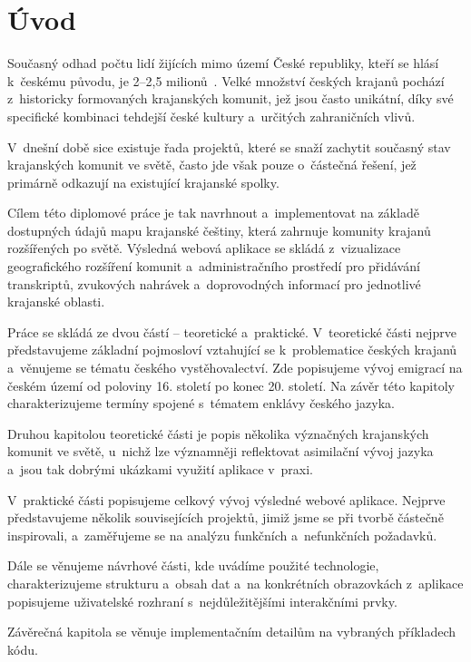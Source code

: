 \hypertarget{uxfavod}{%
\chapter*{Úvod}\label{uvod}}

Současný odhad počtu lidí žijících mimo území České republiky, kteří se hlásí k~českému původu, je 2--2,5 milionů~\parencite{Krajane-mv2}. Velké množství českých krajanů pochází z~historicky formovaných krajanských komunit, jež jsou často unikátní, díky své specifické kombinaci tehdejší české kultury a~určitých zahraničních vlivů.

V~dnešní době sice existuje řada projektů, které se snaží zachytit současný stav krajanských komunit ve světě, často jde však pouze o~částečná řešení, jež primárně odkazují na existující krajanské spolky.

Cílem této diplomové práce je tak navrhnout a~implementovat na základě dostupných údajů mapu krajanské češtiny, která zahrnuje komunity krajanů rozšířených po světě. Výsledná webová aplikace se skládá z~vizualizace geografického rozšíření komunit a~administračního prostředí pro přidávání transkriptů, zvukových nahrávek a~doprovodných informací pro jednotlivé krajanské oblasti.

Práce se skládá ze dvou částí -- teoretické a~praktické. V~teoretické části nejprve představujeme základní pojmosloví vztahující se k~problematice českých krajanů a~věnujeme se tématu českého vystěhovalectví. Zde popisujeme vývoj emigrací na českém území od poloviny 16. století po konec 20. století. Na závěr této kapitoly charakterizujeme termíny spojené s~tématem enklávy českého jazyka.

Druhou kapitolou teoretické části je popis několika význačných krajanských komunit ve světě, u~nichž lze významněji reflektovat asimilační vývoj jazyka a~jsou tak dobrými ukázkami využití aplikace v~praxi.

V~praktické části popisujeme celkový vývoj výsledné webové aplikace. Nejprve představujeme několik souvisejících projektů, jimiž jsme se při tvorbě částečně inspirovali, a~zaměřujeme se na analýzu funkčních a~nefunkčních požadavků.

Dále se věnujeme návrhové části, kde uvádíme použité technologie, charakterizujeme strukturu a~obsah dat a~na konkrétních obrazovkách z~aplikace popisujeme uživatelské rozhraní s~nejdůležitějšími interakčními prvky.

Závěrečná kapitola se věnuje implementačním detailům na vybraných příkladech kódu.
